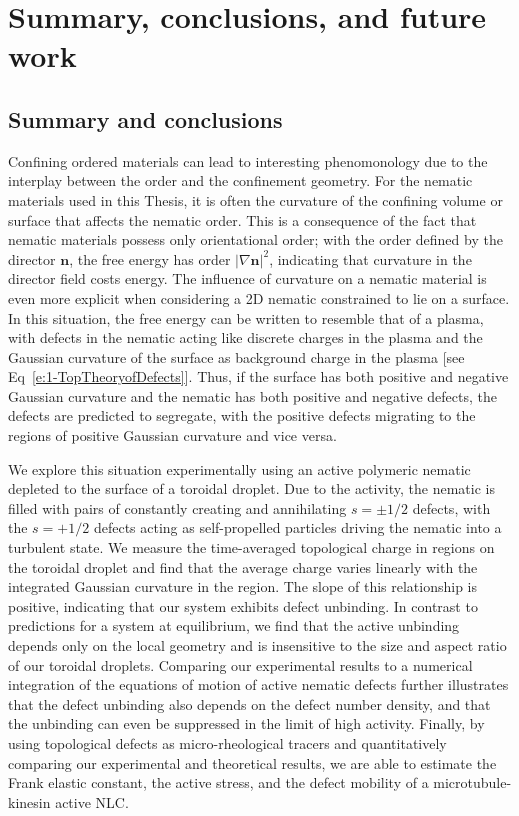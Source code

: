 \chapter{Summary, conclusions, and future work}

\section{Summary and conclusions}
Confining ordered materials can lead to interesting phenomonology due to the interplay between the order and the confinement geometry.
For the nematic materials used in this Thesis, it is often the curvature of the confining volume or surface that affects the nematic order.
This is a consequence of the fact that nematic materials possess only orientational order; with the order defined by the director $\mathbf{n}$, the free energy has order $|\nabla \mathbf{n}|^2$, indicating that curvature in the director field costs energy.
The influence of curvature on a nematic material is even more explicit when considering a 2D nematic constrained to lie on a surface.
In this situation, the free energy can be written to resemble that of a plasma, with defects in the nematic acting like discrete charges in the plasma and the Gaussian curvature of the surface as background charge in the plasma  [see Eq~\ref{e:1-TopTheoryofDefects}].
Thus, if the surface has both positive and negative Gaussian curvature and the nematic has both positive and negative defects, the defects are predicted to segregate, with the positive defects migrating to the regions of positive Gaussian curvature and vice versa.

We explore this situation experimentally using an active polymeric nematic depleted to the surface of a toroidal droplet.
Due to the activity, the nematic is filled with pairs of constantly creating and annihilating $s = \pm 1/2$ defects, with the $s = +1/2$ defects acting as self-propelled particles driving the nematic into a turbulent state.
We measure the time-averaged topological charge in regions on the toroidal droplet and find that the average charge varies linearly with the integrated Gaussian curvature in the region.
The slope of this relationship is positive, indicating that our system exhibits defect unbinding.
In contrast to predictions for a system at equilibrium, we find that the active unbinding depends only on the local geometry and is insensitive to the size and aspect ratio of our toroidal droplets.
Comparing our experimental results to a numerical integration of the equations of motion of active nematic defects further illustrates that the defect unbinding also depends on the defect number density, and that the unbinding can even be suppressed in the limit of high activity.
Finally, by using topological defects as micro-rheological tracers and quantitatively comparing our experimental and theoretical results, we are able to estimate the Frank elastic constant, the active stress, and the defect mobility of a microtubule-kinesin active NLC.


